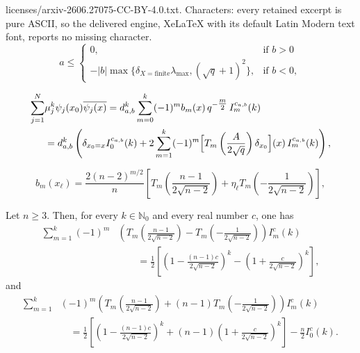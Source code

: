\documentclass[10pt,a4paper]{amsart}
\begin{document}
licenses/arxiv-2606.27075-CC-BY-4.0.txt. Characters: every retained excerpt is pure ASCII, so the delivered engine, XeLaTeX with its default Latin Modern text font, reports no missing character.
\begin{equation}\label{eq:edge}
a\leq \begin{cases}
0, & \text{if } b>0 \\
-|b|\max\{\delta_{X={\textrm{finite}}}\lambda_{\max}, (\sqrt{q}+1)^2\}, & \text{if } b<0,
\end{cases}
\end{equation}

\begin{equation}\label{eq. trace fla}
\begin{split}
        \sum_{j=1}^N& 
\mu_j^k 
\psi_j(x_0)\overline{\psi_j(x)} = d_{a,b}^k \sum_{m=0}^{k} (-1)^{m} b_m(x) \, q^{-\tfrac{m}{2}} \, I_{m}^{c_{a,b}}(k)\\
&=d_{a,b}^k \left( \delta_{x_0=x}I_0^{c_{a,b}}(k) + 2 \sum_{m=1}^{k} (-1)^{m} \Bigl[T_m\left(\frac{A}{2\sqrt{q}}\right)\delta_{x_0}\Bigr](x)\, I_{m}^{c_{a,b}}(k)\right),
\end{split}
\end{equation}

\begin{equation}\label{eq. bm complete graph}
b_m(x_\ell)
=
\frac{2(n-2)^{m/2}}{n}
\left[
T_m\!\left(\frac{n-1}{2\sqrt{n-2}}\right)
+
\eta_\ell
T_m\!\left(-\frac{1}{2\sqrt{n-2}}\right)
\right],
\end{equation}

\begin{corollary}\label{cor:Kn_c_identities}
Let $n\ge3$. Then, for every $k\in\mathbb N_0$ and every real number $c$, one has
\begin{equation}\label{eq:Kn_first_identity}
\begin{split}
\sum_{m=1}^{k}
(-1)^m
&\left(
T_m\!\left(\frac{n-1}{2\sqrt{n-2}}\right)
-
T_m\!\left(-\frac{1}{2\sqrt{n-2}}\right)
\right)
I_m^{c}(k)\\
&\qquad =
\frac12
\left[
\left(1-\frac{(n-1)c}{2\sqrt{n-2}}\right)^k
-
\left(1+\frac{c}{2\sqrt{n-2}}\right)^k
\right],
\end{split}
\end{equation}
and 
\begin{equation}\label{eq:Kn_second_identity}
\begin{split}
\sum_{m=1}^{k}&
(-1)^m
\left(
T_m\!\left(\frac{n-1}{2\sqrt{n-2}}\right)
+
(n-1)T_m\!\left(-\frac{1}{2\sqrt{n-2}}\right)
\right)
I_m^{c}(k)\\
&\quad =
\frac12
\left[
\left(1-\frac{(n-1)c}{2\sqrt{n-2}}\right)^k
+
(n-1)
\left(1+\frac{c}{2\sqrt{n-2}}\right)^k
\right]
-\frac{n}{2}I_0^c(k).
\end{split}
\end{equation}
\end{corollary}
\end{document}
